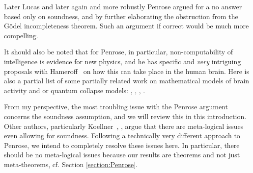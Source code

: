 \documentclass{amsart}  %
\numberwithin{equation}{section}
\theoremstyle{definition}
\theoremstyle{remark}
\begin{document}
{Later Lucas \cite{citeLucas} and later again and more robustly Penrose \cite{citePenroseBeyondShadow} argued for a no answer based only on soundness, and by further elaborating the  obstruction from the G\"odel incompleteness theorem. Such an argument if correct would be much more compelling.  %

It should also be noted that for Penrose, in particular, non-computability of intelligence is evidence for new physics, and he has specific and \emph{very} intriguing proposals with Hameroff~\cite{citeHAMEROFF201439} on how this can take place in the human brain.  Here is also a partial list of some partially related work on mathematical models of brain activity and or quantum collapse models: \cite{cite:Quanta}, \cite{citeKremnizer2015}, \cite{citeHoffmanAgents}, \cite{cite:GrindfordConsciousnessPerspective}.

From my perspective, the most troubling issue with the Penrose argument concerns the soundness assumption, and we will review this in this introduction. Other authors, particularly Koellner~\cite{citeKoellner2018-KOEOTQ-3}, \cite{citeKoellnerII2018-KOEOTQ-4}, argue that there are  meta-logical issues even allowing for soundness. Following a technically very different approach to Penrose, we intend to completely resolve these issues here. In particular, there should be no meta-logical issues because our results are theorems and not just meta-theorems, cf. Section \ref{section:Penrose}. 

}
\end{document}
